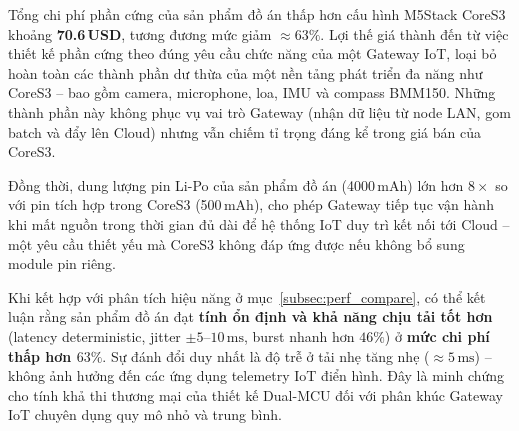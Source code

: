         Tổng chi phí phần cứng của sản phẩm đồ án thấp hơn cấu hình M5Stack CoreS3 khoảng \textbf{70{.}6\,USD}, tương đương mức giảm \textbf{$\approx 63\%$}. Lợi thế giá thành đến từ việc thiết kế phần cứng theo đúng yêu cầu chức năng của một Gateway IoT, loại bỏ hoàn toàn các thành phần dư thừa của một nền tảng phát triển đa năng như CoreS3 -- bao gồm camera, microphone, loa, IMU và compass BMM150. Những thành phần này không phục vụ vai trò Gateway (nhận dữ liệu từ node LAN, gom batch và đẩy lên Cloud) nhưng vẫn chiếm tỉ trọng đáng kể trong giá bán của CoreS3.
        
        Đồng thời, dung lượng pin Li-Po của sản phẩm đồ án (4000\,mAh) lớn hơn $8\times$ so với pin tích hợp trong CoreS3 (500\,mAh), cho phép Gateway tiếp tục vận hành khi mất nguồn trong thời gian đủ dài để hệ thống IoT duy trì kết nối tới Cloud -- một yêu cầu thiết yếu mà CoreS3 không đáp ứng được nếu không bổ sung module pin riêng.
        
        Khi kết hợp với phân tích hiệu năng ở mục~\ref{subsec:perf_compare}, có thể kết luận rằng sản phẩm đồ án đạt \textbf{tính ổn định và khả năng chịu tải tốt hơn} (latency deterministic, jitter $\pm 5$--$10\,\text{ms}$, burst nhanh hơn $46\%$) ở \textbf{mức chi phí thấp hơn $63\%$}. Sự đánh đổi duy nhất là độ trễ ở tải nhẹ tăng nhẹ ($\approx 5\,\text{ms}$) -- không ảnh hưởng đến các ứng dụng telemetry IoT điển hình. Đây là minh chứng cho tính khả thi thương mại của thiết kế Dual-MCU đối với phân khúc Gateway IoT chuyên dụng quy mô nhỏ và trung bình.
    \newpage